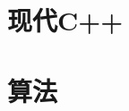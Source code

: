 \documentclass[11pt,oneside]{book}
\begin{document}


\tableofcontents

\chapter{现代C++}



\chapter{算法}

\end{document}
